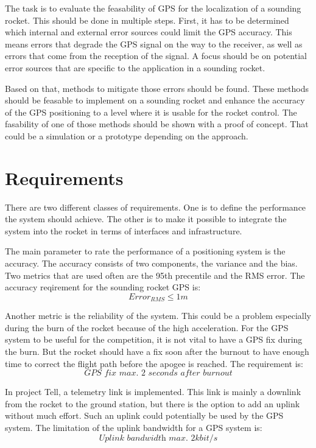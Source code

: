 The task is to evaluate the feasability of GPS for the localization of a sounding rocket.
This should be done in multiple steps.
First, it has to be determined which internal and external error sources could limit the GPS accuracy.
This means errors that degrade the GPS signal on the way to the receiver, as well as errors that come from the reception of the signal.
A focus should be on potential error sources that are specific to the application in a sounding rocket.

Based on that, methods to mitigate those errors should be found.
These methods should be feasable to implement on a sounding rocket and enhance the accuracy of the GPS positioning to a level where it is usable for the rocket control.
The fasability of one of those methods should be shown with a proof of concept.
That could be a simulation or a prototype depending on the approach.


\section{Requirements}\label{sec:requirements}

There are two different classes of requirements.
One is to define the performance the system should achieve.
The other is to make it possible to integrate the system into the rocket in terms of interfaces and infrastructure.

The main parameter to rate the performance of a positioning system is the accuracy.
The accuracy consists of two components, the variance and the bias.
Two metrics that are used often are the 95th precentile and the RMS error.
The accuracy reqirement for the sounding rocket GPS is:
$$ Error_{RMS} \le 1m $$

Another metric is the reliability of the system.
This could be a problem especially during the burn of the rocket because of the high acceleration.
For the GPS system to be useful for the competition, it is not vital to have a GPS fix during the burn.
But the rocket should have a fix soon after the burnout to have enough time to correct the flight path before the apogee is reached.
The requirement is:
$$ \textit{GPS fix max. 2 seconds after burnout} $$

In project Tell, a telemetry link is implemented.
This link is mainly a downlink from the rocket to the ground station, but there is the option to add an uplink without much effort.
Such an uplink could potentially be used by the GPS system.
The limitation of the uplink bandwidth for a GPS system is:
$$ \textit{Uplink bandwidth max. 2kbit/s} $$